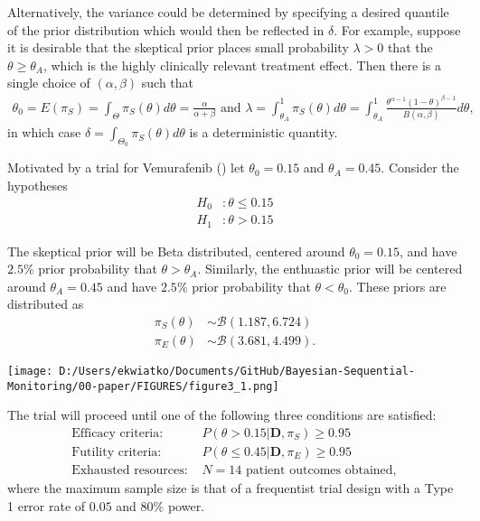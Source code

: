 \documentclass[12pt]{article}
\begin{document}
Alternatively, the variance could be determined by specifying a desired quantile of the prior distribution which would then be reflected in $\delta$. For example, suppose it is desirable that the skeptical prior places small probability $\lambda>0$ that the $\theta\geq\theta_A$, which is the highly clinically relevant treatment effect. Then there is a single choice of $(\alpha,\beta)$ such that
\begin{align*}
\theta_0=E(\pi_S)=\int_{\Theta}\pi_S(\theta)d\theta=\frac{\alpha}{\alpha+\beta}\text{ and }\lambda=\int_{\theta_A}^{1}\pi_S(\theta)d\theta=\int_{\theta_A}^{1}\frac{\theta^{\alpha-1}(1-\theta)^{\beta-1}}{B(\alpha,\beta)}d\theta,
\end{align*}
in which case $\delta=\int_{\Theta_0}\pi_S(\theta)d\theta$ is a deterministic quantity.

Motivated by a trial for Vemurafenib (\cite{Hyman2015}) let $\theta_0=0.15$ and $\theta_A=0.45$. Consider the hypotheses
\begin{align*}
H_0&:\theta\leq 0.15\\
H_1&:\theta>0.15
\end{align*}

The skeptical prior will be Beta distributed, centered around $\theta_0=0.15$, and have $2.5\%$ prior probability that $\theta>\theta_A$. Similarly, the enthuastic prior will be centered around $\theta_A=0.45$ and have $2.5\%$ prior probability that $\theta<\theta_0$. These priors are distributed as
\begin{align*}
\pi_S(\theta)&\sim\mathcal{B}(1.187,6.724)\\
\pi_E(\theta)&\sim\mathcal{B}(3.681,4.499).
\end{align*}
\begin{center}
\texttt{[image: D:/Users/ekwiatko/Documents/GitHub/Bayesian-Sequential-Monitoring/00-paper/FIGURES/figure3\_1.png]}
\end{center}
The trial will proceed until one of the following three conditions are satisfied:
\begin{align*}
\text{Efficacy criteria: }&P(\theta>0.15|\mathbf{D},\pi_S)\geq 0.95\\
\text{Futility criteria: }&P(\theta\leq 0.45|\mathbf{D},\pi_E)\geq 0.95\\
\text{Exhausted resources: }&N=14 \text{ patient outcomes obtained},
\end{align*}
where the maximum sample size is that of a frequentist trial design with a Type 1 error rate of $0.05$ and $80\%$ power.
\end{document}
